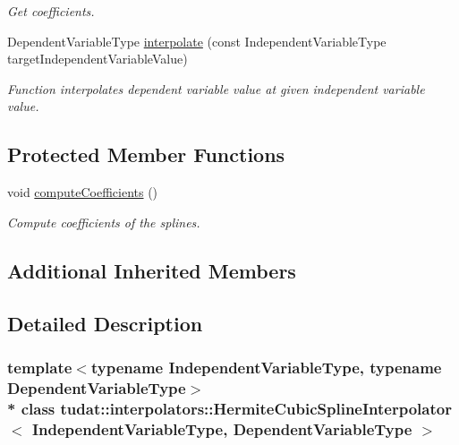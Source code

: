 \begin{DoxyCompactItemize}
\begin{DoxyCompactList}\small\item\em Get coefficients. \end{DoxyCompactList}\item 
Dependent\+Variable\+Type \hyperlink{classtudat_1_1interpolators_1_1HermiteCubicSplineInterpolator_a3f82bb48c7218d7c7ed53ea86ad4e679}{interpolate} (const Independent\+Variable\+Type target\+Independent\+Variable\+Value)
\begin{DoxyCompactList}\small\item\em Function interpolates dependent variable value at given independent variable value. \end{DoxyCompactList}\end{DoxyCompactItemize}
\subsection*{Protected Member Functions}
\begin{DoxyCompactItemize}
\item 
void \hyperlink{classtudat_1_1interpolators_1_1HermiteCubicSplineInterpolator_a1776c11d272dbe912c7dcc1cdd177538}{compute\+Coefficients} ()\hypertarget{classtudat_1_1interpolators_1_1HermiteCubicSplineInterpolator_a1776c11d272dbe912c7dcc1cdd177538}{}\label{classtudat_1_1interpolators_1_1HermiteCubicSplineInterpolator_a1776c11d272dbe912c7dcc1cdd177538}

\begin{DoxyCompactList}\small\item\em Compute coefficients of the splines. \end{DoxyCompactList}\end{DoxyCompactItemize}
\subsection*{Additional Inherited Members}


\subsection{Detailed Description}
\subsubsection*{template$<$typename Independent\+Variable\+Type, typename Dependent\+Variable\+Type$>$\\*
class tudat\+::interpolators\+::\+Hermite\+Cubic\+Spline\+Interpolator$<$ Independent\+Variable\+Type, Dependent\+Variable\+Type $>$}

